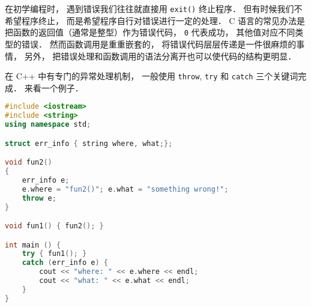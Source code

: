 
在初学编程时， 遇到错误我们往往就直接用 \verb|exit()| 终止程序． 但有时候我们不希望程序终止， 而是希望程序自行对错误进行一定的处理． C 语言的常见办法是把函数的返回值（通常是整型）作为错误代码， \verb|0| 代表成功， 其他值对应不同类型的错误． 然而函数调用是重重嵌套的， 将错误代码层层传递是一件很麻烦的事情， 另外， 把错误处理和函数调用的语法分离开也可以使代码的结构更明显．

在 C++ 中有专门的异常处理机制， 一般使用 \verb|throw|, \verb|try| 和 \verb|catch| 三个关键词完成． 来看一个例子．

\begin{lstlisting}[language=cpp]
#include <iostream>
#include <string>
using namespace std;

struct err_info { string where, what;};

void fun2()
{
	err_info e;
	e.where = "fun2()"; e.what = "something wrong!";
	throw e;
}

void fun1() { fun2(); }

int main () {
	try { fun1(); }
	catch (err_info e) {
		cout << "where: " << e.where << endl;
		cout << "what: " << e.what << endl; 
	}
}
\end{lstlisting}
